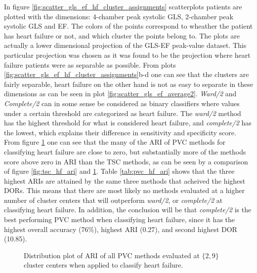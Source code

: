 In figure \ref{fig:scatter_gls_ef_hf_cluster_assignments} scatterplots patients are plotted with the dimensions: 4-chamber peak systolic GLS, 2-chamber peak systolic GLS and EF. 
The colors of the points correspond to wheather the patient has heart failure or not, and which cluster the points belong to.
The plots are actually a lower dimensional projection of the GLS-EF peak-value dataset. 
This particular projection was chosen as it was found to be the projection where heart failure patients were as separable as possible. 
From plots \ref{fig:scatter_gls_ef_hf_cluster_assignments}b-d one can see that the clusters are fairly separable, 
heart failure on the other hand is not as easy to separate in these dimensions as can be seen in plot \ref{fig:scatter_gls_ef_average2}. 
\textit{Ward/2} and \textit{Complete/2} can in some sense be considered as binary classifiers where values under a certain threshold are categorized as heart failure.
The \textit{ward/2} method has the highest threshold for what is considered heart failure, and \textit{complete/2} has the lowest, 
which explains their difference in sensitivity and specificity score. 
From figure \ref{fig:pvc_hf_ari} one can see that the many of the ARI of PVC methods for classifying heart failure are close to zero, but substantially more of the methods score above zero in ARI
than the TSC methods, as can be seen by a comparison of figure \ref{fig:tsc_hf_ari} and \ref{fig:pvc_hf_ari}. Table \ref{tab:pvc_hf_ari} shows that the three highest ARIs are attained by the same
three methods that acheived the highest DORs. This means that there are most likely no methods evaluated at a higher number of cluster centers that will outperform \textit{ward/2},
or \textit{complete/2} at classifying heart failure. In addition, the conclusion will be that \textit{complete/2} is the best performing PVC method when classifying heart failure, 
since it has the highest overall accuracy (76$\%$), highest ARI (0.27), and second highest DOR (10.85). 

\begin{figure}[htb]
    \centering
    
    \caption{Distribution plot of ARI of all PVC methods evaluated at $\{2,9\}$ cluster centers when applied to classify heart failure.}
    \label{fig:pvc_hf_ari}
\end{figure}

